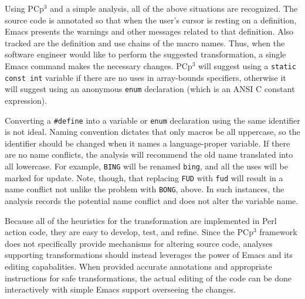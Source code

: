 \documentclass{article}
\newcommand{\pcp}{\mbox{\textsf{PCp}$^3$}}
\newcommand{\Perl}{\mbox{Perl}}
\newcommand{\C}{\mbox{C}}
\newcommand{\ppd}[1]{\texttt{\##1}}
\begin{document}
\noindent Using \pcp{} and a simple analysis, all of the above
situations are recognized.  The source code is annotated so that when
the user's cursor is resting on a definition, Emacs presents the
warnings and other messages related to that definition.  Also tracked
are the definition and use chains of the macro names.  Thus, when the
software engineer would like to perform the suggested transformation, a
single Emacs command makes the necessary changes.  \pcp{} will suggest
using a \texttt{static const int} variable if there are no uses in
array-bounds specifiers, otherwise it will suggest using an anonymous
\texttt{enum} declaration (which is an ANSI \C{} constant expression).

Converting a \ppd{define} into a variable or \texttt{enum} declaration
using the same identifier is not ideal.  Naming convention dictates that only
macros be all uppercase, so the identifier should be changed when it
names a language-proper variable.  If there are no name conflicts, the analysis will recommend
the old name translated into all lowercase.  For example, \texttt{BING} will be renamed
\texttt{bing}, and all the uses will be marked for update.  Note, though, that
replacing \texttt{FUD} with \texttt{fud} will result in a name conflict
not unlike the problem with \texttt{BONG}, above.  In such instances,
the analysis records the potential name conflict and does not
alter the variable name.


Because all of the heuristics for the transformation are implemented in
\Perl{} action code, they are easy to develop, test, and refine.  Since
the \pcp{} framework does not specifically provide mechanisms for
altering source code, analyses supporting transformations should instead
leverages the power of Emacs and its editing capabalities.  When provided
accurate annotations and appropriate instructions for safe
transformations, the actual editing of the code can be done
interactively with simple Emacs support overseeing the changes.


\end{document}
